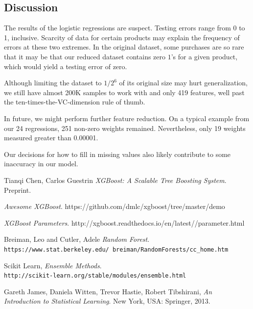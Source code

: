 \documentclass{article}
\begin{document}
\begin{spacing}{1}
\begin{large}
\subsection{Discussion}

\begin{multicols}{2}


The results of the logistic regressions are suspect. Testing errors range from 0 to 1, inclusive. Scarcity of data for certain products may explain the frequency of errors at these two extremes. In the original dataset, some purchases are so rare that it may be that our reduced dataset contains zero $1$'s for a given product, which would yield a testing error of zero.

Although limiting the dataset to $1/2^6$ of its original size may hurt generalization, we still have almost 200K samples to work with and only 419 features, well past the ten-times-the-VC-dimension rule of thumb.\cite{Amlbook}

In future, we might perform further feature reduction. On a typical example from our 24 regressions, 251 non-zero weights remained. Nevertheless, only 19 weights measured greater than 0.00001.

Our decisions for how to fill in missing values also likely contribute to some inaccuracy in our model.

\end{multicols}

\newpage

\begin{thebibliography}{9}

	Tianqi Chen, Carlos Guestrin
	\emph{XGBoost: A Scalable Tree Boosting System}. Preprint.

	\emph{Awesome XGBoost}.
	https://github.com/dmlc/xgboost/tree/master/demo

	\emph{XGBoost Parameters}.
	http://xgboost.readthedocs.io/en/latest//parameter.html

	Breiman, Leo and Cutler, Adele
	\textit{Random Forest}.
	\\\texttt{https://www.stat.berkeley.edu/~breiman/RandomForests/cc\_home.htm}

	Scikit Learn,
	\textit{Ensemble Methods}.
	\\\texttt{http://scikit-learn.org/stable/modules/ensemble.html}

	Gareth James, Daniela Witten, Trevor Hastie, Robert Tibshirani, \textit{An Introduction to Statistical Learning}. New York, USA: Springer, 2013.


\end{thebibliography}
\end{large}
\end{spacing}
\end{document}
